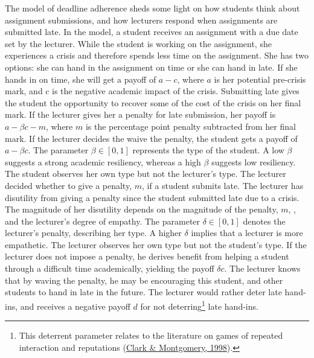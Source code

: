 \documentclass[11pt,preprint, authoryear]{elsarticle}
\numberwithin{equation}{section}
\numberwithin{figure}{section}
\numberwithin{table}{section}
\let\rmarkdownfootnote\footnote%
\def\footnote{\protect\rmarkdownfootnote}
\begin{document}
The model of deadline adherence sheds some light on how students think
about assignment submissions, and how lecturers respond when assignments
are submitted late. In the model, a student receives an assignment with
a due date set by the lecturer. While the student is working on the
assignment, she experiences a crisis and therefore spends less time on
the assignment. She has two options: she can hand in the assignment on
time or she can hand in late. If she hands in on time, she will get a
payoff of \(a-c\), where \(a\) is her potential pre-crisis mark, and
\(c\) is the negative academic impact of the crisis. Submitting late
gives the student the opportunity to recover some of the cost of the
crisis on her final mark. If the lecturer gives her a penalty for late
submission, her payoff is \(a-\beta c -m\), where \(m\) is the
percentage point penalty subtracted from her final mark. If the lecturer
decides the waive the penalty, the student gets a payoff of
\(a-\beta c\). The parameter \(\beta \in [0,1]\) represents the type of
the student. A low \(\beta\) suggests a strong academic resiliency,
whereas a high \(\beta\) suggests low resiliency. The student observes
her own type but not the lecturer's type. The lecturer decided whether
to give a penalty, \(m\), if a student submits late. The lecturer has
disutility from giving a penalty since the student submitted late due to
a crisis. The magnitude of her disutility depends on the magnitude of
the penalty, \(m\), , and the lecturer's degree of empathy. The
parameter \(\delta \in [0,1]\) denotes the lecturer's penalty,
describing her type. A higher \(\delta\) implies that a lecturer is more
empathetic. The lecturer observes her own type but not the student's
type. If the lecturer does not impose a penalty, he derives benefit from
helping a student through a difficult time academically, yielding the
payoff \(\delta c\). The lecturer knows that by waving the penalty, he
may be encouraging this student, and other students to hand in late in
the future. The lecturer would rather deter late hand-ins, and receives
a negative payoff \(d\) for not deterring\footnote{This deterrent
  parameter relates to the literature on games of repeated interaction
  and reputations (\protect\hyperlink{ref-deter}{Clark \& Montgomery,
  1998}).} late hand-ins.
\end{document}
